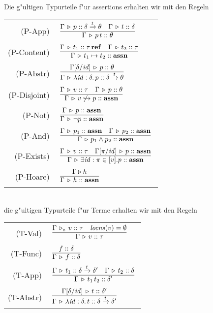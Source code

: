\documentclass[12pt,a4paper,bigheadings]{scrartcl}
\newcommand{\assn}{\ensuremath{\mathbf{assn}}}
\newcommand{\locns}{\name{locns}}
\newcommand{\tto}{\ensuremath{\xrightarrow{t}}}
\renewcommand{\disjoint}[2]{\ensuremath{#2\not\hookrightarrow#1}}
\newcommand{\RN}[1]{\mbox{{\sc (#1)}}}
\newcommand{\Tje}[3]{#1 \,\tr_e\, #2\cc#3}
\begin{document}
Die g"ultigen Typurteile f"ur assertions erhalten wir mit den Regeln \\[3mm]
\begin{tabular}{rl}
  \RN{P-App} & $\regel{\Tj{\Gamma}{p}{\delta \tto \theta} \quad \Tj{\Gamma}{t}{\delta}}
                      {\Tj{\Gamma}{\app{p}{t}}{\theta}}$ \\[1mm]
  \RN{P-Content} & $\regel{\Tj{\Gamma}{t_1}{\reftype{\tau}} \quad \Tj{\Gamma}{t_2}{\tau}}
                          {\Tj{\Gamma}{t_1 \mapsto t_2}{\assn}}$ \\[1mm]
  \RN{P-Abstr} & $\regel{\Tj{\Gamma[\delta/\id]}{p}{\theta}}
                        {\Tj{\Gamma}{\abstr{\id:\delta}{p}}{\delta \tto \theta}}$ \\[1mm]
  \RN{P-Disjoint} & $\regel{\Tj{\Gamma}{v}{\tau} \quad \Tj{\Gamma}{p}{\theta}}
                           {\Tj{\Gamma}{\disjoint{p}{v}}{\assn}}$ \\[1mm]
  \RN{P-Not} & $\regel{\Tj{\Gamma}{p}{\assn}}
                      {\Tj{\Gamma}{\neg p}{\assn}}$ \\[1mm]
  \RN{P-And} & $\regel{\Tj{\Gamma}{p_1}{\assn} \quad \Tj{\Gamma}{p_2}{\assn}}
                      {\Tj{\Gamma}{p_1 \wedge p_2}{\assn}}$ \\[1mm]
  \RN{P-Exists} & $\regel{\Tj{\Gamma}{v}{\tau} \quad \Tj{\Gamma[\pi/\id]}{p}{\assn}}
                         {\Tj{\Gamma}{\exists \id:\pi\in[v].p}{\assn}}$ \\[1mm]
  \RN{P-Hoare} & $\regel{\Tjh{\Gamma}{h}}
                        {\Tj{\Gamma}{h}{\assn}}$
\end{tabular} \\[3mm]
die g"ultigen Typurteile f"ur Terme erhalten wir mit den Regeln \\[3mm]
\begin{tabular}{rl}
  \RN{T-Val} & $\regel{\Tje{\Gamma}{v}{\tau} \quad \locns(v)=\emptyset}
                      {\Tj{\Gamma}{v}{\tau}}$ \\[1mm]
  \RN{T-Func} & $\regel{\tj{f}{\delta}}
                       {\Tj{\Gamma}{f}{\delta}}$ \\[1mm]
  \RN{T-App} & $\regel{\Tj{\Gamma}{t_1}{\delta \tto \delta'} \quad \Tj{\Gamma}{t_2}{\delta}}
                      {\Tj{\Gamma}{\app{t_1}{t_2}}{\delta'}}$ \\[1mm]
  \RN{T-Abstr} & $\regel{\Tj{\Gamma[\delta/\id]}{t}{\delta'}}
                        {\Tj{\Gamma}{\abstr{\id:\delta}{t}}{\delta \tto \delta'}}$ \\[1mm]
\end{tabular} \\[3mm]
\end{document}
